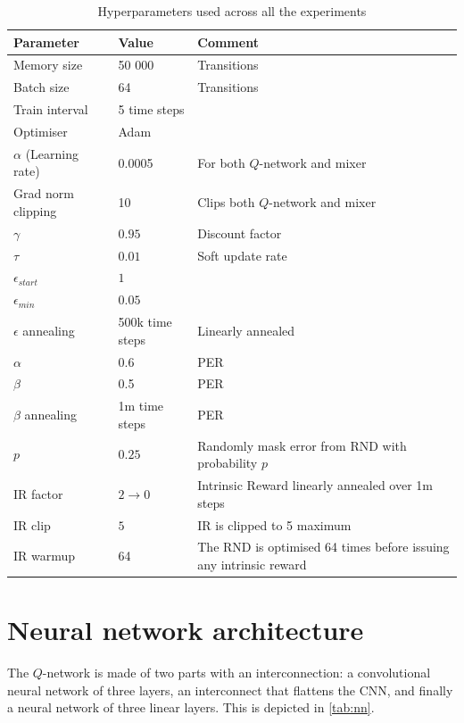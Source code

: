 \begin{table}[h]
    \centering
    \caption{Hyperparameters used across all the experiments}
    \begin{tabular}{l|l|p{7cm}}
        \textbf{Parameter} & \textbf{Value} & \textbf{Comment} \\
        \hline
        Memory size & 50 000 & Transitions\\
        Batch size & 64 & Transitions\\
        Train interval & 5 time steps & \\
        Optimiser & Adam & \\
        $\alpha$ (Learning rate) & 0.0005 & For both $Q$-network and mixer \\
        Grad norm clipping & 10 & Clips both $Q$-network and mixer\\
        $\gamma$ & $0.95$ & Discount factor\\
        $\tau$ & $0.01$ & Soft update rate\\
        $\epsilon_{start}$ & $1$ &\\
        $\epsilon_{min}$ & $0.05$ &\\
        $\epsilon$ annealing & 500k time steps & Linearly annealed\\
        \hline
        $\alpha$ & 0.6 & PER \\
        $\beta$ & 0.5 & PER \\
        $\beta$ annealing & 1m time steps & PER\\
        \hline
        $p$ & $0.25$ & Randomly mask error from RND with probability $p$\\
        IR factor & $2 \rightarrow 0$ & Intrinsic Reward linearly annealed over 1m steps\\
        IR clip & $5$ & IR is clipped to 5 maximum\\
        IR warmup & 64 & The RND is optimised 64 times before issuing any intrinsic reward\\
        \hline
    \end{tabular}
\end{table}

\newpage
\section{Neural network architecture}
\label{apx:nn_architecture}
The $Q$-network is made of two parts with an interconnection: a convolutional neural network of three layers, an interconnect that flattens the CNN, and finally a neural network of three linear layers. This is depicted in \autoref{tab:nn}.

